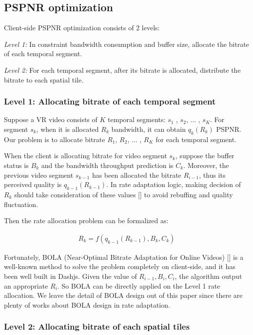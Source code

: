 \subsection{PSPNR optimization}

Client-side PSPNR optimization consists of 2 levels:

\emph{Level 1:} In constraint bandwidth consumption and buffer size, allocate the bitrate of each temporal segment.

\emph{Level 2:} For each temporal segment, after its bitrate is allocated, distribute the bitrate to each spatial tile.

\subsubsection{Level 1: Allocating bitrate of each temporal segment}

Suppose a VR video consists of $K$ temporal segments: $s_1$ , $s_2$, ... , $s_K$. For segment $s_k$, when it is allocated $R_k$ bandwidth, it can obtain $q_{k}(R_k)$ PSPNR. Our problem is to allocate bitrate $R_1$, $R_2$, ... , $R_K$ for each temporal segment.

When the client is allocating bitrate for video segment $s_k$, suppose the buffer status is $B_k$ and the bandwidth throughput prediction is $C_k$. Moreover, the previous video segment $s_{k-1}$ has been allocated the bitrate $R_{i-1}$, thus its perceived quality is $q_{k-1}(R_{k-1})$. In rate adaptation logic, making decision of $R_k$ should take consideration of these values [] to avoid rebuffing and quality fluctuation.

Then the rate allocation problem can be formalized as:

\begin{equation}
\begin{aligned}
R_k = f(q_{k-1}(R_{k-1}), B_k, C_k)
\end{aligned}
\end{equation}

Fortunately, BOLA (Near-Optimal Bitrate Adaptation for Online Videos) [] is a well-known method to solve the problem completely on client-side, and it has been well built in Dashjs. Given the value of $R_{i-1}, B_i, C_i$, the algorithm output an appropriate $R_i$. So BOLA can be directly applied on the Level 1 rate allocation. We leave the detail of BOLA design out of this paper since there are plenty of works about BOLA design in rate adaptation.

\subsubsection{Level 2: Allocating bitrate of each spatial tiles}

